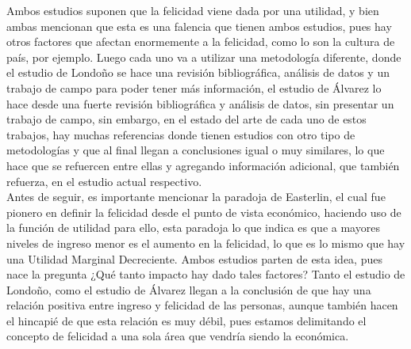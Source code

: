 Ambos estudios suponen que la felicidad viene dada por una utilidad, y bien ambas mencionan que esta es una falencia que tienen ambos estudios, pues hay otros factores que afectan enormemente a la felicidad, como lo son la cultura de país, por ejemplo. Luego cada uno va a utilizar una metodología diferente, donde el estudio de Londoño se hace una revisión bibliográfica, análisis de datos y un trabajo de campo para poder tener más información, el estudio de Álvarez lo hace desde una fuerte revisión bibliográfica y análisis de datos, sin presentar un trabajo de campo, sin embargo, en el estado del arte de cada uno de estos trabajos, hay muchas referencias donde tienen estudios con otro tipo de metodologías y que al final llegan a conclusiones igual o muy similares, lo que hace que se refuercen entre ellas y agregando información adicional, que también refuerza, en el estudio actual respectivo. \\

Antes de seguir, es importante mencionar la paradoja de Easterlin, el cual fue pionero en definir la felicidad desde el punto de vista económico, haciendo uso de la función de utilidad para ello, esta paradoja lo que indica es que a mayores niveles de ingreso menor es el aumento en la felicidad, lo que es lo mismo que hay una Utilidad Marginal Decreciente. Ambos estudios parten de esta idea, pues nace la pregunta ¿Qué tanto impacto hay dado tales factores? Tanto el estudio de Londoño, como el estudio de Álvarez llegan a la conclusión de que hay una relación positiva entre ingreso y felicidad de las personas, aunque también hacen el hincapié de que esta relación es muy débil, pues estamos delimitando el concepto de felicidad a una sola área que vendría siendo la económica.\\



\newpage

